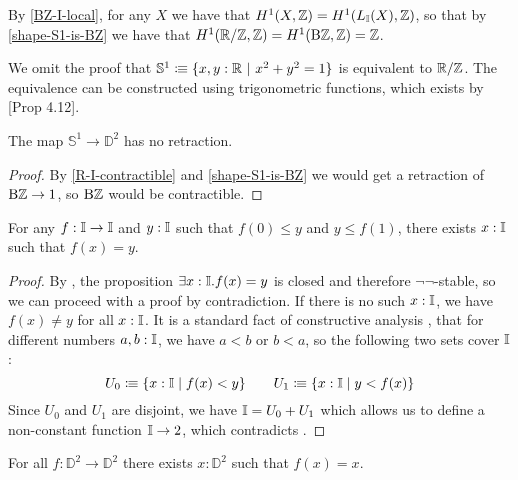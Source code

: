 \begin{remark}
By \cref{BZ-I-local}, for any $X$ we have that $H^1(X,\mathbb{Z}) = H^1(L_{\mathbb{I}}(X),\mathbb{Z})$, so that by \cref{shape-S1-is-BZ} we have that $H^1(\mathbb{R}/\mathbb{Z},\mathbb{Z}) = H^1(\mathrm{B}\mathbb{Z},\mathbb{Z}) = \mathbb{Z}$.
\end{remark}

We omit the proof that $\mathbb{S}^1\colonequiv\{x,y:\R\ \vert\ x^2+y^2=1\}$ is equivalent to $\mathbb{R}/\mathbb{Z}$.
The equivalence can be constructed using trigonometric functions, which exists by \cite{Bishop}[Prop 4.12].

\begin{proposition}
\label{no-retraction}
The map $\mathbb{S}^1\to \mathbb{D}^2$ has no retraction.
\end{proposition}

\begin{proof}
By \cref{R-I-contractible} and \cref{shape-S1-is-BZ} we would get a retraction of $\mathrm{B}\mathbb{Z}\to 1$, so $\mathrm{B}\mathbb{Z}$ would be contractible.
\end{proof}

\begin{theorem}
  \label{ivt}
  For any $f: \mathbb{I}\to \mathbb{I}$ and $y:\mathbb{I}$ such that $f(0)\leq y$ and $y\leq f(1)$,
  there exists $x:\mathbb{I}$ such that $f(x)=y$.
\end{theorem}

\begin{proof}
  By , the proposition $\exists x:\mathbb{I}.f(x)=y$ is closed and therefore $\neg\neg$-stable, so we can proceed with a proof by contradiction.
  If there is no such $x:\mathbb{I}$, we have $f(x)\neq y$ for all $x:\mathbb{I}$.
  It is a standard fact of constructive analysis \cite{Bishop}, that for different numbers $a,b:\mathbb{I}$, we have $a<b$ or $b<a$, so the following two sets cover $\mathbb{I}$:
  \[
    U_0\vcentcolon\mspace{-1.2mu}\equiv \{x:\mathbb{I}\mid f(x)<y\} \quad\quad
    U_1\vcentcolon\mspace{-1.2mu}\equiv \{x:\mathbb{I}\mid y<f(x)\}
    \]
  Since $U_0$ and $U_1$ are disjoint, we have $\mathbb{I}=U_0+U_1$ which allows us to define a non-constant function $\mathbb{I}\to 2$, which contradicts .
\end{proof}

\begin{theorem}
  For all $f:\mathbb{D}^2\to \mathbb{D}^2$ there exists $x:\mathbb{D}^2$ such that $f(x)=x$.
\end{theorem}

